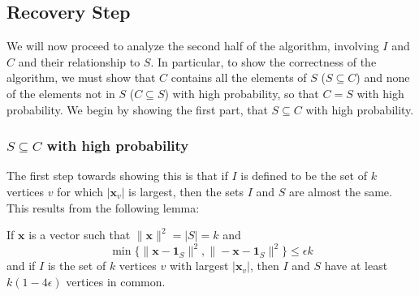 \documentclass{article}
\begin{document}
\subsection{Recovery Step}
We will now proceed to analyze the second half of the algorithm, involving $I$
and $C$ and their relationship to $S$. In particular, to show the correctness
of the algorithm, we must show that $C$ contains all the elements of $S$ ($S
\subseteq C$) and none of the elements not in $S$ ($C \subseteq S$) with high
probability, so that $C = S$ with high probability. We begin by showing the first part, that $S \subseteq C$ with high probability.

\subsubsection{$S \subseteq C$ with high probability}
\label{S subseteq C}
The first step towards showing this is that if $I$ is defined to be the set of
$k$ vertices $v$ for which $|\mathbf{x}_{v}|$ is largest, then the sets $I$ and $S$ are almost
the same. This results from the following lemma:
\begin{lemma}
    \label{intersection}
    If $\mathbf{x}$ is a vector such that $\|\mathbf{x}\|^{2} = |S| = k$ and
    $$\min\{\|\mathbf{x} - \mathbf{1}_{S}\|^{2}, \|-\mathbf{x} - \mathbf{1}_{S}\|^{2}\} \leq
    \epsilon k$$
    and if $I$ is the set of $k$ vertices $v$ with largest $|\mathbf{x}_{v}|$, then $I$
    and $S$ have at least $k(1 - 4 \epsilon)$ vertices in common.
\end{lemma}
\end{document}
